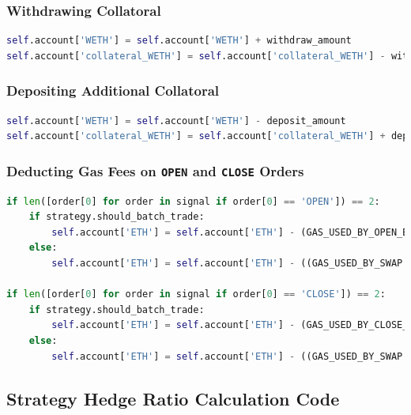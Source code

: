 \subsubsection{Withdrawing Collatoral}
\begin{lstlisting}[language=Python, caption={Execution code for withdrawing a selected amount of collateral},captionpos=b]
self.account['WETH'] = self.account['WETH'] + withdraw_amount
self.account['collateral_WETH'] = self.account['collateral_WETH'] - withdraw_amount
\end{lstlisting}

\subsubsection{Depositing Additional Collatoral}
\begin{lstlisting}[language=Python, caption={Execution code for depositing a selected amount of collateral},captionpos=b]
self.account['WETH'] = self.account['WETH'] - deposit_amount
self.account['collateral_WETH'] = self.account['collateral_WETH'] + deposit_amount
\end{lstlisting}

\subsubsection{Deducting Gas Fees on \texttt{OPEN} and \texttt{CLOSE} Orders \label{app:deducting-gas-fee}}
\begin{lstlisting}[language=Python, caption={Execution code for deducting gas fees on \texttt{OPEN} and \texttt{CLOSE} orders},captionpos=b]
if len([order[0] for order in signal if order[0] == 'OPEN']) == 2:
    if strategy.should_batch_trade:
        self.account['ETH'] = self.account['ETH'] - (GAS_USED_BY_OPEN_BUY_AND_SELL_POSITION * gas_price_in_eth)
    else:
        self.account['ETH'] = self.account['ETH'] - ((GAS_USED_BY_SWAP + GAS_USED_BY_SWAP + GAS_USED_BY_BORROW) * gas_price_in_eth)

if len([order[0] for order in signal if order[0] == 'CLOSE']) == 2:
    if strategy.should_batch_trade:
        self.account['ETH'] = self.account['ETH'] - (GAS_USED_BY_CLOSE_BUY_AND_SELL_POSITION * gas_price_in_eth)
    else:
        self.account['ETH'] = self.account['ETH'] - ((GAS_USED_BY_SWAP + GAS_USED_BY_SWAP + GAS_USED_BY_REPAY) * gas_price_in_eth)

\end{lstlisting}


\subsection{Strategy Hedge Ratio Calculation Code \label{app:strats-hr-calcs}}

